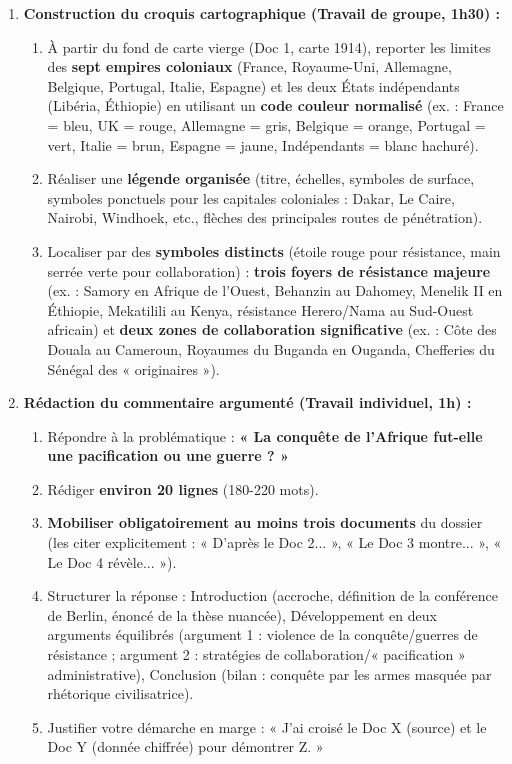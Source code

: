 \documentclass[11pt]{article}
\newcommand{\cle}[1]{{\popxbold\color{popdark}#1}}
\newcounter{popsec}
\newcounter{popsub}
\newcommand{\courssub}[1]{%
  \stepcounter{popsub}%
  \par\vspace{9pt}\noindent{\popxbold\fontsize{11.5}{13}\selectfont\color{popink}{\color{poporange}\thepopsec.\thepopsub}\hspace{6pt}#1}\par\nopagebreak\vspace{4pt}
}
\begin{document}
\courssub{Consignes}
\begin{enumerate}
    \item \textbf{Construction du croquis cartographique (Travail de groupe, 1h30) :}
    \begin{enumerate}
        \item À partir du fond de carte vierge (Doc 1, carte 1914), reporter les limites des \textbf{sept empires coloniaux} (France, Royaume-Uni, Allemagne, Belgique, Portugal, Italie, Espagne) et les deux États indépendants (Libéria, Éthiopie) en utilisant un \textbf{code couleur normalisé} (ex. : France = bleu, UK = rouge, Allemagne = gris, Belgique = orange, Portugal = vert, Italie = brun, Espagne = jaune, Indépendants = blanc hachuré).
        \item Réaliser une \textbf{légende organisée} (titre, échelles, symboles de surface, symboles ponctuels pour les capitales coloniales : Dakar, Le Caire, Nairobi, Windhoek, etc., flèches des principales routes de pénétration).
        \item Localiser par des \textbf{symboles distincts} (étoile rouge pour résistance, main serrée verte pour collaboration) : \textbf{trois foyers de résistance majeure} (ex. : Samory en Afrique de l'Ouest, Behanzin au Dahomey, Menelik II en Éthiopie, Mekatilili au Kenya, résistance Herero/Nama au Sud-Ouest africain) et \textbf{deux zones de collaboration significative} (ex. : Côte des Douala au Cameroun, Royaumes du Buganda en Ouganda, Chefferies du Sénégal des « originaires »).
    \end{enumerate}
    \item \textbf{Rédaction du commentaire argumenté (Travail individuel, 1h) :}
    \begin{enumerate}
        \item Répondre à la problématique : \textbf{« La conquête de l'Afrique fut-elle une pacification ou une guerre ? »}
        \item Rédiger \textbf{environ 20 lignes} (180-220 mots).
        \item \textbf{Mobiliser obligatoirement au moins trois documents} du dossier (les citer explicitement : « D'après le Doc 2... », « Le Doc 3 montre... », « Le Doc 4 révèle... »).
        \item Structurer la réponse : Introduction (accroche, définition de la \cle{conférence de Berlin}, énoncé de la thèse nuancée), Développement en deux arguments équilibrés (argument 1 : violence de la conquête/guerres de résistance ; argument 2 : stratégies de collaboration/« pacification » administrative), Conclusion (bilan : conquête par les armes masquée par rhétorique civilisatrice).
        \item Justifier votre démarche en marge : « J'ai croisé le Doc X (source) et le Doc Y (donnée chiffrée) pour démontrer Z. »
    \end{enumerate}
\end{enumerate}
\end{document}
